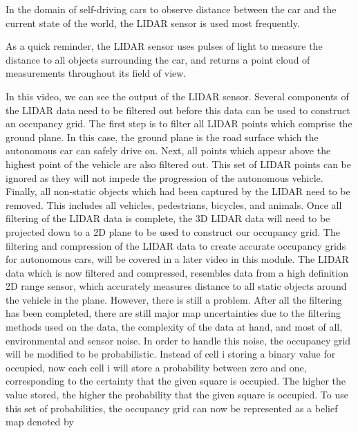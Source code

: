 In the domain of  self-driving cars to observe distance between the car and the current state
of the world, the LIDAR sensor is
used most frequently. 

\begin{framed}
	\begin{remark}
		

As a quick reminder, the LIDAR sensor uses
pulses of light to measure the distance to
all objects surrounding the car, and returns a point cloud of measurements throughout
its field of view. 
\end{remark}
\end{framed}


In this video, we can see
the output of the LIDAR sensor. Several components of the LIDAR
data need to be filtered out before this data can be used to construct
an occupancy grid. The first step is to filter all LIDAR points which
comprise the ground plane. In this case, the ground plane is the road surface which the autonomous car
can safely drive on. Next, all points
which appear above the highest point of the vehicle
are also filtered out. This set of LIDAR points
can be ignored as they will not impede
the progression of the autonomous vehicle. Finally, all non-static
objects which had been captured by the LIDAR
need to be removed. This includes all vehicles, pedestrians, bicycles,
and animals. Once all filtering of
the LIDAR data is complete, the 3D LIDAR data will need
to be projected down to a 2D plane to be used to
construct our occupancy grid. The filtering and compression
of the LIDAR data to create accurate occupancy
grids for autonomous cars, will be covered in
a later video in this module. The LIDAR data which is now
filtered and compressed, resembles data from a high
definition 2D range sensor, which accurately
measures distance to all static objects around
the vehicle in the plane. However, there is
still a problem. After all the filtering
has been completed, there are still
major map uncertainties due to the filtering methods
used on the data, the complexity of
the data at hand, and most of all, environmental
and sensor noise. In order to handle this noise, the occupancy grid will be
modified to be probabilistic. Instead of cell i storing
a binary value for occupied, now each cell i will store a probability between
zero and one, corresponding to the certainty that the given square
is occupied. The higher the value stored, the higher the probability that the given square is occupied. To use this set of probabilities, the occupancy grid can
now be represented as a belief map denoted by
